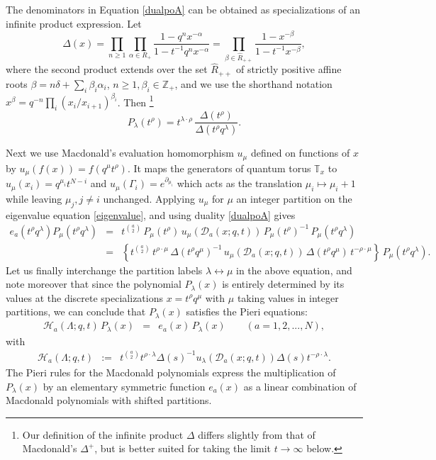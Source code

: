 \documentclass[12pt]{amsart}
\newcommand{\D}{{\mathcal{D}}}
\newcommand{\cH}{{\mathcal{H}}}
\newcommand{\Z}{{\mathbb Z}}
\newcommand{\al}{{\alpha}}
\numberwithin{equation}{section}
\begin{document}
The denominators in Equation \eqref{dualpoA} can be obtained as specializations of an infinite product expression.
Let
\begin{equation}
\Delta(x) = \prod_{n\geq 1} \prod_{\alpha\in R_+} \frac{1-q^n x^{-\alpha}}{1-t^{-1}q^n x^{-\alpha}}=
\prod_{\beta\in \hat R_{++}} \frac{1-x^{-\beta}}{1-t^{-1}x^{-\beta}},\label{DeltaA}
\end{equation}
where the second product extends over the set $\hat R_{++}$ of strictly positive affine roots $\beta=n\delta+\sum_i \beta_i\al_i$, $n\geq 1,\beta_i\in \Z_+$, and we use the shorthand notation $x^\beta=q^{-n} \prod_i (x_{i}/x_{i+1})^{\beta_i}$.
Then  \cite{macdo}\footnote{Our definition of the infinite product $\Delta$ differs slightly from
that of Macdonald's $\Delta^+$, but is better suited for taking the limit $t\to\infty$ below.}
\begin{equation}\label{normPA}
P_\lambda(t^\rho)=t^{\lambda\cdot\rho}\,\frac{\Delta(t^\rho)}{\Delta(t^\rho q^\lambda)}.
\end{equation}
%
%
%

Next we use Macdonald's evaluation homomorphism $u_\mu$ defined on functions of $x$ by $u_\mu(f(x))=f(q^\mu t^\rho)$. It maps the generators of quantum torus $\mathbb T_x$ to
$u_\mu(x_i)=q^{\mu_i}t^{N-i}$ and $u_\mu(\Gamma_i)=e^{\partial_{\mu_i}}$ which acts as the translation $\mu_i\mapsto \mu_i+1$ while leaving $\mu_j,j\neq i$ unchanged.
Applying $u_\mu$ for $\mu$ an integer partition on  the eigenvalue equation \eqref{eigenvalue}, and using duality \eqref{dualpoA} gives
\begin{eqnarray*}
e_a(t^\rho q^\lambda) P_\mu(t^\rho q^\lambda)&=& t^{{a\choose2}}\, P_\mu(t^\rho)\,u_\mu\left(\D_a(x;q,t)\right) \,P_\mu(t^\rho)^{-1} \,P_\mu(t^\rho q^\lambda)\\
&=& \left\{t^{{a\choose2}}\, t^{\rho\cdot\mu}\,\Delta(t^\rho q^\mu)^{-1}\, u_\mu\left(\D_a(x;q,t)\right) \, \Delta(t^\rho q^\mu)\, t^{-\rho\cdot\mu}\right\} \,
P_\mu(t^\rho q^\lambda).
\end{eqnarray*}
Let us finally interchange the partition labels $\lambda\leftrightarrow \mu$ in the above equation, and note moreover that since
the polynomial $P_\lambda(x)$ is entirely determined by its values at the discrete specializations $x=t^\rho q^\mu$ with $\mu$ taking values in integer partitions, we can conclude that $P_\lambda(x)$ satisfies the Pieri equations:
\begin{eqnarray}
\cH_a(\Lambda;q,t)\, P_\lambda(x)&=& e_a(x)\, P_\lambda(x) \qquad (a=1,2,...,N)\label{PieriA} ,
\end{eqnarray}
with 
\begin{eqnarray}
\cH_a(\Lambda;q,t)&:=&
t^{{a\choose 2}}t^{\rho\cdot \lambda} \Delta(s)^{-1} u_\lambda\left(\D_a(x;q,t)\right) \Delta(s) t^{-\rho\cdot\lambda}\label{PieriHA}.
\end{eqnarray} 
The Pieri rules for the Macdonald polynomials express the multiplication of $P_\lambda(x)$ by an elementary symmetric function $e_a(x)$ as a linear combination
of Macdonald polynomials with shifted partitions. 
\end{document}
